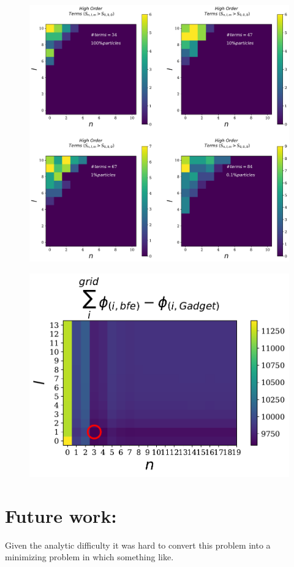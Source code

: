 \documentclass[14pt]{article}
\begin{document}
\begin{figure}[H]
\includegraphics[scale=0.5]{n_terms.pdf}
\end{figure}


\begin{figure}[H]
\centering
\includegraphics[scale=0.7]{potential_dif_Ncoeff_dep.pdf}
\end{figure}

\section*{Future work:}

Given the analytic difficulty it was hard to convert this problem
into a minimizing problem in which something like.
\end{document}
